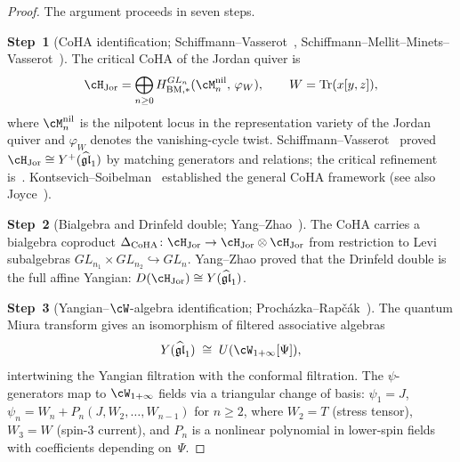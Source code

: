 \begin{proof}
The argument proceeds in seven steps.

\medskip
\noindent
\textbf{Step~1}
(CoHA identification;
Schiffmann--Vasserot~\cite{SV13},
Schiffmann--Mellit--Minets--Vasserot~\cite{SMMV23}).
The critical CoHA of the Jordan quiver is
\[
  \cH_{\mathrm{Jor}}
  = \bigoplus_{n \geq 0}
  H^{GL_n}_{\mathrm{BM},*}
  (\cM_n^{\mathrm{nil}},\, \varphi_W),
  \qquad
  W = \mathrm{Tr}(x[y,z]),
\]
where $\cM_n^{\mathrm{nil}}$ is the nilpotent locus in
the representation variety of the Jordan quiver and
$\varphi_W$ denotes the vanishing-cycle twist.
Schiffmann--Vasserot~\cite{SV13} proved
$\cH_{\mathrm{Jor}} \cong Y^+(\widehat{\mathfrak{gl}}_1)$
by matching generators and relations; the critical
refinement is~\cite{SMMV23}.
Kontsevich--Soibelman~\cite{KS11} established the general
CoHA framework (see also Joyce~\cite{Joyce18}).

\medskip
\noindent
\textbf{Step~2}
(Bialgebra and Drinfeld double; Yang--Zhao~\cite{YZ18a}).
The CoHA carries a bialgebra coproduct
$\Delta_{\mathrm{CoHA}} \colon
\cH_{\mathrm{Jor}} \to
\cH_{\mathrm{Jor}} \otimes \cH_{\mathrm{Jor}}$
from restriction to Levi subalgebras
$GL_{n_1} \times GL_{n_2} \hookrightarrow GL_n$.
Yang--Zhao proved that the Drinfeld double is the full
affine Yangian: $D(\cH_{\mathrm{Jor}}) \cong
Y(\widehat{\mathfrak{gl}}_1)$.

\medskip
\noindent
\textbf{Step~3}
(Yangian--$\cW$-algebra identification;
Proch\'azka--Rap\v{c}\'ak~\cite{PR19}).
The quantum Miura transform gives an isomorphism of
filtered associative algebras
\[
  Y(\widehat{\mathfrak{gl}}_1)
  \;\cong\;
  U(\cW_{1+\infty}[\Psi]),
\]
intertwining the Yangian filtration with the conformal
filtration. The $\psi$-generators map to
$\cW_{1+\infty}$ fields via a triangular change
of basis: $\psi_1 = J$,
$\psi_n = W_n + P_n(J, W_2, \ldots, W_{n-1})$
for $n \geq 2$, where $W_2 = T$ (stress tensor),
$W_3 = W$ (spin-$3$ current), and $P_n$ is a
nonlinear polynomial in lower-spin fields with
coefficients depending on~$\Psi$.


\end{proof}
